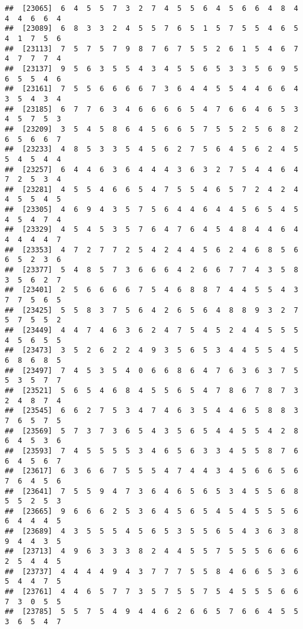 \documentclass[
]{book}
\begin{document}
\begin{verbatim}
##  [23065]  6  4  5  5  7  3  2  7  4  5  5  6  4  5  6  6  4  8  4  4  4  6  6  4
##  [23089]  6  8  3  3  2  4  5  5  7  6  5  1  5  7  5  5  4  6  5  4  1  7  5  6
##  [23113]  7  5  7  5  7  9  8  7  6  7  5  5  2  6  1  5  4  6  7  4  7  7  7  4
##  [23137]  9  5  6  3  5  5  4  3  4  5  5  6  5  3  3  5  6  9  5  6  5  5  4  6
##  [23161]  7  5  5  6  6  6  6  7  3  6  4  4  5  5  4  4  6  6  4  3  5  4  3  4
##  [23185]  6  7  7  6  3  4  6  6  6  6  5  4  7  6  6  4  6  5  3  4  5  7  5  3
##  [23209]  3  5  4  5  8  6  4  5  6  6  5  7  5  5  2  5  6  8  2  6  5  6  6  7
##  [23233]  4  8  5  3  3  5  4  5  6  2  7  5  6  4  5  6  2  4  5  5  4  5  4  4
##  [23257]  6  4  4  6  3  6  4  4  4  3  6  3  2  7  5  4  4  6  4  7  2  5  3  4
##  [23281]  4  5  5  4  6  6  5  4  7  5  5  4  6  5  7  2  4  2  4  4  5  5  4  5
##  [23305]  4  6  9  4  3  5  7  5  6  4  4  6  4  4  5  6  5  4  5  4  5  4  7  4
##  [23329]  4  5  4  5  3  5  7  6  4  7  6  4  5  4  8  4  4  6  4  4  4  4  4  7
##  [23353]  4  7  2  7  7  2  5  4  2  4  4  5  6  2  4  6  8  5  6  6  5  2  3  6
##  [23377]  5  4  8  5  7  3  6  6  6  4  2  6  6  7  7  4  3  5  8  3  5  6  2  7
##  [23401]  2  5  6  6  6  6  7  5  4  6  8  8  7  4  4  5  5  4  3  7  7  5  6  5
##  [23425]  5  5  8  3  7  5  6  4  2  6  5  6  4  8  8  9  3  2  7  5  7  5  5  2
##  [23449]  4  4  7  4  6  3  6  2  4  7  5  4  5  2  4  4  5  5  5  4  5  6  5  5
##  [23473]  3  5  2  6  2  2  4  9  3  5  6  5  3  4  4  5  5  4  5  6  8  6  8  5
##  [23497]  7  4  5  3  5  4  0  6  6  8  6  4  7  6  3  6  3  7  5  5  3  5  7  7
##  [23521]  5  6  5  4  6  8  4  5  5  6  5  4  7  8  6  7  8  7  3  2  4  8  7  4
##  [23545]  6  6  2  7  5  3  4  7  4  6  3  5  4  4  6  5  8  8  3  7  6  5  7  5
##  [23569]  5  7  3  7  3  6  5  4  3  5  6  5  4  4  5  5  4  2  8  6  4  5  3  6
##  [23593]  7  4  5  5  5  5  3  4  6  5  6  3  3  4  5  5  8  7  6  6  4  5  6  7
##  [23617]  6  3  6  6  7  5  5  5  4  7  4  4  3  4  5  6  6  5  6  7  6  4  5  6
##  [23641]  7  5  5  9  4  7  3  6  4  6  5  6  5  3  4  5  5  6  8  5  5  2  5  3
##  [23665]  9  6  6  6  2  5  3  6  4  5  6  5  4  5  4  5  5  5  6  6  4  4  4  5
##  [23689]  4  3  5  5  5  4  5  6  5  3  5  5  6  5  4  3  6  3  8  9  4  4  3  5
##  [23713]  4  9  6  3  3  3  8  2  4  4  5  5  7  5  5  5  6  6  6  2  5  4  4  5
##  [23737]  4  4  4  4  9  4  3  7  7  7  5  5  8  4  6  6  5  3  6  5  4  4  7  5
##  [23761]  4  4  6  5  7  7  3  5  7  5  5  7  5  4  5  5  5  6  6  7  3  0  5  5
##  [23785]  5  5  7  5  4  9  4  4  6  2  6  6  5  7  6  6  4  5  5  3  6  5  4  7

\end{verbatim}
\end{document}
